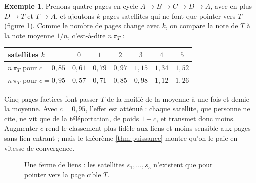 \documentclass[11pt,a4paper]{article}
\theoremstyle{plain}
\theoremstyle{definition}
\newtheorem{exemple}[theoreme]{Exemple}
\theoremstyle{remark}
\begin{document}
\begin{exemple}\label{ex:ferme}
Prenons quatre pages en cycle $A\to B\to C\to D\to A$, avec en plus $D\to T$ et $T\to A$, et ajoutons $k$ pages satellites qui ne font que pointer vers $T$ (figure \ref{fig:ferme}). Comme le nombre de pages change avec $k$, on compare la note de $T$ à la note moyenne $1/n$, c'est-à-dire $n\,\pi_T$ :

\begin{center}
\begin{tabular}{@{}lcccccc@{}}
\toprule
satellites $k$ & $0$ & $1$ & $2$ & $3$ & $4$ & $5$ \\
\midrule
$n\,\pi_T$ pour $c=0{,}85$ & $0{,}61$ & $0{,}79$ & $0{,}97$ & $1{,}15$ & $1{,}34$ & $1{,}52$ \\
$n\,\pi_T$ pour $c=0{,}95$ & $0{,}57$ & $0{,}71$ & $0{,}85$ & $0{,}98$ & $1{,}12$ & $1{,}26$ \\
\bottomrule
\end{tabular}
\end{center}

Cinq pages factices font passer $T$ de la moitié de la moyenne à une fois et demie la moyenne. Avec $c=0{,}95$, l'effet est atténué : chaque satellite, que personne ne cite, ne vit que de la téléportation, de poids $1-c$, et transmet donc moins. Augmenter $c$ rend le classement plus fidèle aux liens et moins sensible aux pages sans lien entrant ; mais le théorème \ref{thm:puissance} montre qu'on le paie en vitesse de convergence.
\end{exemple}

\begin{figure}[h]
\centering
{}
\caption{Une ferme de liens : les satellites $s_1,\dots,s_5$ n'existent que pour pointer vers la page cible $T$.}\label{fig:ferme}
\end{figure}
\end{document}
